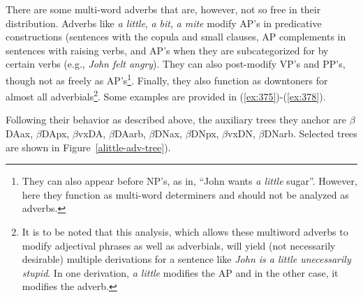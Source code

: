  
\beginsentences
{}\label{ex:373} 
\endsentences

 
\beginsentences
{}\label{ex:374} 
\endsentences

 
 
There are some multi-word adverbs that are, however, not so free in their 
distribution. Adverbs like {\it a little}, {\it a bit}, {\it a mite} modify 
AP's in predicative constructions (sentences with the copula and small 
clauses, AP complements in sentences with raising verbs, and AP's when they 
are subcategorized for by certain verbs (e.g., {\it John felt angry}). They 
can also post-modify VP's and PP's, though not as freely as 
AP's\footnote{They can also appear before NP's, as in, ``John wants {\it a little} sugar''. However, here they function as multi-word determiners and should not be analyzed as adverbs.}. Finally, they also function as 
downtoners for almost all adverbials\footnote{It is to be noted that this analysis, which allows these multiword adverbs to modify adjectival phrases as well as adverbials, will yield (not necessarily desirable) multiple derivations for a sentence like {\it John is a little unecessarily stupid}. In one derivation, {\it a little} modifies the AP and in the other case, it modifies the adverb.}. Some examples are provided in 
(\ref{ex:375})-(\ref{ex:378}). 
 
 
\beginsentences
{}\label{ex:375} 
\endsentences

 
\beginsentences
{}\label{ex:376} 
\endsentences

 
\beginsentences
{}\label{ex:377} 
\endsentences

 
\beginsentences
{}\label{ex:378} 
\endsentences

 
Following their behavior as described above, the auxiliary trees they 
anchor are $\beta$DAax, $\beta$DApx, $\beta$vxDA, $\beta$DAarb, 
$\beta$DNax, $\beta$DNpx, $\beta$vxDN, $\beta$DNarb. Selected trees are 
shown in Figure~\ref{alittle-adv-tree}). 
 
